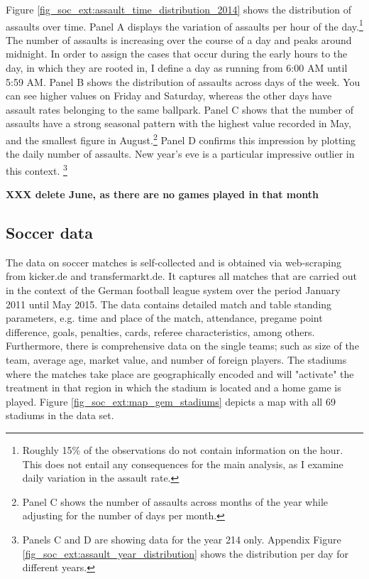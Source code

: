 \documentclass[11pt, a4paper]{article} %
\begin{document}
Figure \ref{fig_soc_ext:assault_time_distribution_2014} shows the distribution of assaults over time. Panel A displays the variation of assaults per hour of the day.\footnote{Roughly 15\% of the observations do not contain information on the hour. This does not entail any consequences for the main analysis, as I examine daily variation in the assault rate.} The number of assaults is increasing over the course of a day and peaks around midnight. In order to assign the cases that occur during the early hours to the day, in which they are rooted in, I define a day as running from 6:00 AM until 5:59 AM. Panel B shows the distribution of assaults across days of the week. You can see higher values on Friday and Saturday, whereas the other days have assault rates belonging to the same ballpark. Panel C shows that the number of assaults have a strong seasonal pattern with the highest value recorded in May, and the smallest figure in August.\footnote{Panel C shows the number of assaults across months of the year while adjusting for the number of days per month.} Panel D confirms this impression by plotting the daily number of assaults. New year's eve is a particular impressive outlier in this context. \footnote{Panels C and D are showing data for the year 214 only. Appendix Figure \ref{fig_soc_ext:assault_year_distribution} shows the distribution per day for different years.}

\textbf{XXX delete June, as there are no games played in that month}



\subsection{Soccer data}
The data on soccer matches is self-collected and is obtained via web-scraping from kicker.de and transfermarkt.de. It captures all matches that are carried out in the context of the German football league system over the period January 2011 until May 2015. The data contains detailed match and table standing parameters, e.g. time and place of the match, attendance, pregame point difference, goals, penalties, cards, referee characteristics, among others. Furthermore, there is comprehensive data on the single teams; such as size of the team, average age, market value, and number of foreign players. The stadiums where the matches take place are geographically encoded and will "activate" the treatment in that region in which the stadium is located and a home game is played. Figure \ref{fig_soc_ext:map_gem_stadiums} depicts a map with all 69 stadiums in the data set. 
\end{document}
